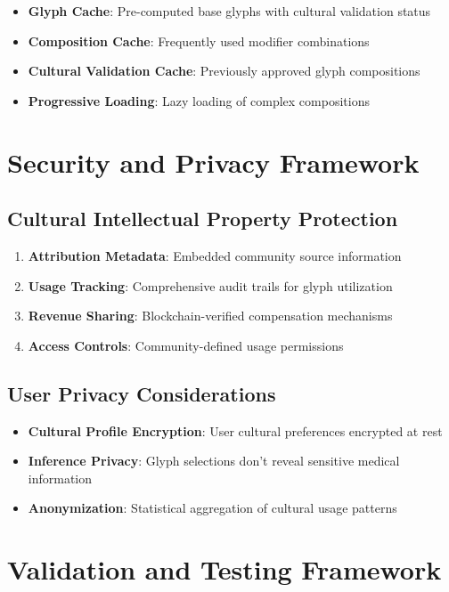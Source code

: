 \documentclass[12pt]{article}
\begin{document}
\begin{itemize}
    \item \textbf{Glyph Cache}: Pre-computed base glyphs with cultural validation status
    \item \textbf{Composition Cache}: Frequently used modifier combinations
    \item \textbf{Cultural Validation Cache}: Previously approved glyph compositions
    \item \textbf{Progressive Loading}: Lazy loading of complex compositions
\end{itemize}

\section{Security and Privacy Framework}

\subsection{Cultural Intellectual Property Protection}

\begin{enumerate}
    \item \textbf{Attribution Metadata}: Embedded community source information
    \item \textbf{Usage Tracking}: Comprehensive audit trails for glyph utilization
    \item \textbf{Revenue Sharing}: Blockchain-verified compensation mechanisms
    \item \textbf{Access Controls}: Community-defined usage permissions
\end{enumerate}

\subsection{User Privacy Considerations}

\begin{itemize}
    \item \textbf{Cultural Profile Encryption}: User cultural preferences encrypted at rest
    \item \textbf{Inference Privacy}: Glyph selections don't reveal sensitive medical information
    \item \textbf{Anonymization}: Statistical aggregation of cultural usage patterns
\end{itemize}

\section{Validation and Testing Framework}
\end{document}

